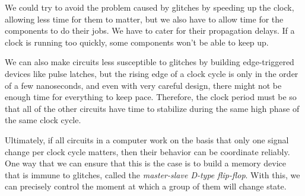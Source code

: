   We could try to avoid the problem caused by glitches by speeding up the clock, allowing less time for them to matter, but we also have to allow time for the components to do their jobs. We have to cater for their propagation delays. If a clock is running too quickly, some components won't be able to keep up. 

  We can also make circuits less susceptible to glitches by building edge-triggered devices like pulse latches, but the rising edge of a clock cycle is only in the order of a few nanoseconds, and even with very careful design, there might not be enough time for everything to keep pace. Therefore, the clock period must be so that all of the other circuits have time to stabilize during the same high phase of the same clock cycle. 

  Ultimately, if all circuits in a computer work on the basis that only one signal change per clock cycle matters, then their behavior can be coordinate reliably. One way that we can ensure that this is the case is to build a memory device that is immune to glitches, called the \textit{master-slave D-type flip-flop}. With this, we can precisely control the moment at which a group of them will change state. 

